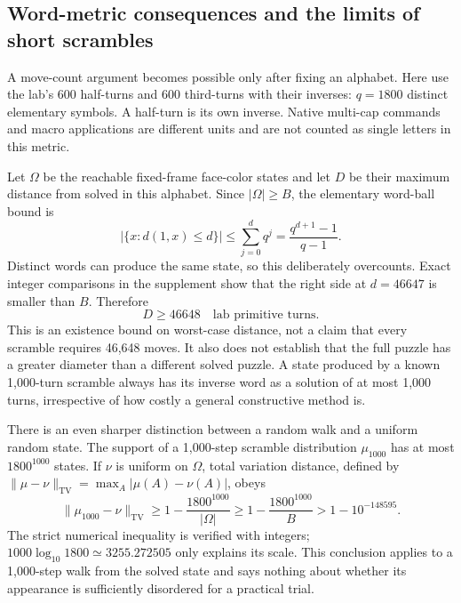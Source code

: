\documentclass[a4paper,11pt]{article}
\begin{document}
\subsection{Word-metric consequences and the limits of short scrambles}

A move-count argument becomes possible only after fixing an alphabet. Here use the lab's 600 half-turns and 600 third-turns with their inverses: \(q=1800\) distinct elementary symbols. A half-turn is its own inverse. Native multi-cap commands and macro applications are different units and are not counted as single letters in this metric.

Let \(\Omega\) be the reachable fixed-frame face-color states and let \(D\) be their maximum distance from solved in this alphabet. Since \(|\Omega|\ge B\), the elementary word-ball bound is
\begin{equation}
|\{x:d(1,x)\le d\}|\le\sum_{j=0}^d q^j
=\frac{q^{d+1}-1}{q-1}.
\label{eq:word-ball}
\end{equation}
Distinct words can produce the same state, so this deliberately overcounts. Exact integer comparisons in the supplement show that the right side at \(d=46647\) is smaller than \(B\). Therefore
\begin{equation}
D\ge46648\quad\text{lab primitive turns}.
\label{eq:diameter-bound}
\end{equation}
This is an existence bound on worst-case distance, not a claim that every scramble requires 46,648 moves. It also does not establish that the full puzzle has a greater diameter than a different solved puzzle. A state produced by a known 1,000-turn scramble always has its inverse word as a solution of at most 1,000 turns, irrespective of how costly a general constructive method is.

There is an even sharper distinction between a random walk and a uniform random state. The support of a 1,000-step scramble distribution \(\mu_{1000}\) has at most \(1800^{1000}\) states. If \(\nu\) is uniform on \(\Omega\), total variation distance, defined by \(\|\mu-\nu\|_{\mathrm{TV}}=\max_A|\mu(A)-\nu(A)|\), obeys
\begin{equation}
\|\mu_{1000}-\nu\|_{\mathrm{TV}}
\ge1-\frac{1800^{1000}}{|\Omega|}
\ge1-\frac{1800^{1000}}{B}
>1-10^{-148595}.
\label{eq:scramble-tv}
\end{equation}
The strict numerical inequality is verified with integers; \(1000\log_{10}1800\simeq3255.272505\) only explains its scale. This conclusion applies to a 1,000-step walk from the solved state and says nothing about whether its appearance is sufficiently disordered for a practical trial.
\end{document}
